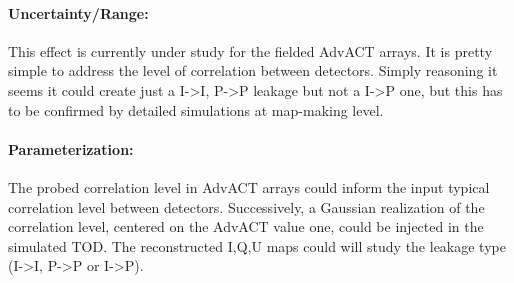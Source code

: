 \paragraph{Uncertainty/Range:}
This effect is currently under study for the fielded AdvACT arrays. It is pretty simple to address the level of correlation between detectors. Simply reasoning it seems it could create just a I->I, P->P leakage but not a I->P one, but this has to be confirmed by detailed simulations at map-making level.

\paragraph{Parameterization:}
The probed correlation level in AdvACT arrays could inform the input typical correlation level between detectors. Successively, a Gaussian realization of the correlation level, centered on the AdvACT value one, could be injected in the simulated TOD. The reconstructed I,Q,U maps could will study the leakage type (I->I, P->P or I->P). 
